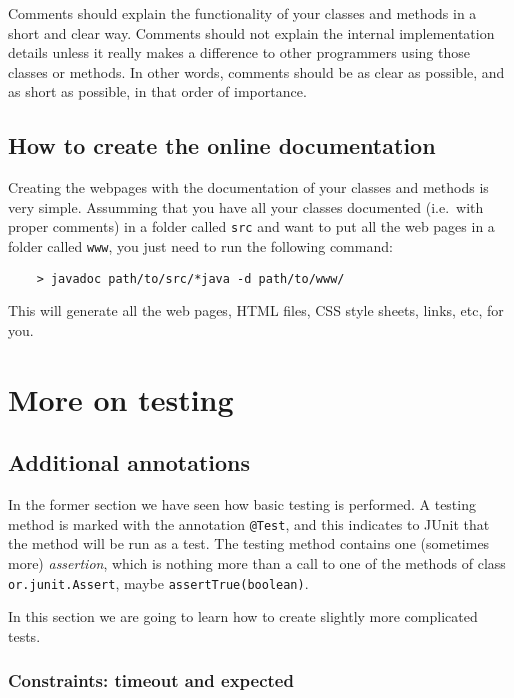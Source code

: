 Comments should explain the functionality of your classes and methods
in a short and clear way. Comments should not explain the internal
implementation details unless it really makes a difference to other
programmers using those classes or methods. In other words, comments
should be as clear as possible, and as short as possible, in that
order of importance. 

\subsection{How to create the online documentation}
\label{sec:how-create-online}

Creating the webpages with the documentation of your classes and
methods is very simple. Assumming that you have all your classes
documented (i.e.~with proper comments) in a folder called \verb+src+
and want to put all the web pages in a folder called \verb+www+, you
just need to run the following command: 

\begin{verbatim}
    > javadoc path/to/src/*java -d path/to/www/
\end{verbatim}

This will generate all the web pages, HTML files, CSS style sheets,
links, etc, for you. 

\section{More on testing}
\label{sec:more-testing}

\subsection{Additional annotations}
\label{sec:addit-annot}

In the former section we have seen how basic testing is performed. A
testing method is marked with the annotation \verb+@Test+, and this
indicates to JUnit that the method will be run as a test. The testing
method contains one (sometimes more) \emph{assertion}, which is
nothing more than a call to one of the methods of class
\verb+or.junit.Assert+, maybe \verb+assertTrue(boolean)+. 

In this section we are going to learn how to create slightly more
complicated tests. 

\subsubsection*{Constraints: timeout and expected}
\label{sec:timeout}

